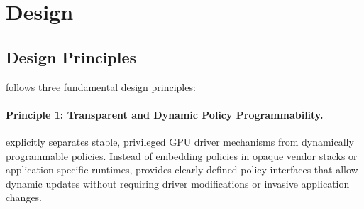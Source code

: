

\section{\sys Design}

\subsection{Design Principles}

\sys follows three fundamental design principles:

\paragraph{Principle 1: Transparent and Dynamic Policy Programmability.}
\sys explicitly separates stable, privileged GPU driver mechanisms from dynamically programmable policies. Instead of embedding policies in opaque vendor stacks or application-specific runtimes, \sys provides clearly-defined policy interfaces that allow dynamic updates without requiring driver modifications or invasive application changes.

